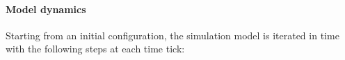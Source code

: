\documentclass[letterpaper]{article}
\begin{document}
\paragraph{Model dynamics}


Starting from an initial configuration, the simulation model is iterated in time with the following steps at each time tick:
\end{document}
